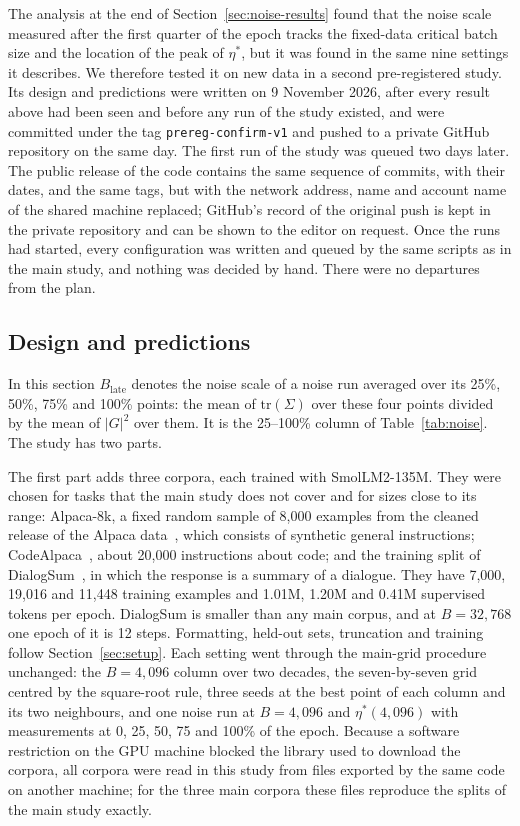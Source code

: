 \documentclass[10pt]{article}
\newcommand{\blate}{B_{\mathrm{late}}}
\begin{document}
The analysis at the end of Section~\ref{sec:noise-results} found that the noise scale measured after the first quarter of the epoch tracks the fixed-data critical batch size and the location of the peak of $\eta^*$, but it was found in the same nine settings it describes. We therefore tested it on new data in a second pre-registered study. Its design and predictions were written on 9 November 2026, after every result above had been seen and before any run of the study existed, and were committed under the tag \texttt{prereg-confirm-v1} and pushed to a private GitHub repository on the same day. The first run of the study was queued two days later. The public release of the code contains the same sequence of commits, with their dates, and the same tags, but with the network address, name and account name of the shared machine replaced; GitHub's record of the original push is kept in the private repository and can be shown to the editor on request. Once the runs had started, every configuration was written and queued by the same scripts as in the main study, and nothing was decided by hand. There were no departures from the plan.

\subsection{Design and predictions}

In this section $\blate$ denotes the noise scale of a noise run averaged over its 25\%, 50\%, 75\% and 100\% points: the mean of $\mathrm{tr}(\Sigma)$ over these four points divided by the mean of $|G|^2$ over them. It is the 25--100\% column of Table~\ref{tab:noise}. The study has two parts.

The first part adds three corpora, each trained with SmolLM2-135M. They were chosen for tasks that the main study does not cover and for sizes close to its range: Alpaca-8k, a fixed random sample of 8,000 examples from the cleaned release of the Alpaca data~\citep{taori2023alpaca}, which consists of synthetic general instructions; CodeAlpaca~\citep{chaudhary2023codealpaca}, about 20,000 instructions about code; and the training split of DialogSum~\citep{chen2021dialogsum}, in which the response is a summary of a dialogue. They have 7,000, 19,016 and 11,448 training examples and 1.01M, 1.20M and 0.41M supervised tokens per epoch. DialogSum is smaller than any main corpus, and at $B = 32{,}768$ one epoch of it is 12 steps. Formatting, held-out sets, truncation and training follow Section~\ref{sec:setup}. Each setting went through the main-grid procedure unchanged: the $B = 4{,}096$ column over two decades, the seven-by-seven grid centred by the square-root rule, three seeds at the best point of each column and its two neighbours, and one noise run at $B = 4{,}096$ and $\eta^*(4{,}096)$ with measurements at 0, 25, 50, 75 and 100\% of the epoch. Because a software restriction on the GPU machine blocked the library used to download the corpora, all corpora were read in this study from files exported by the same code on another machine; for the three main corpora these files reproduce the splits of the main study exactly.
\end{document}
